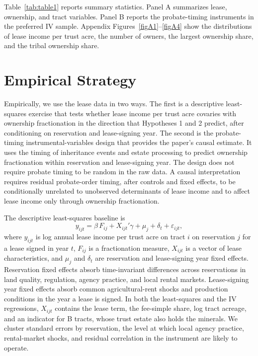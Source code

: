 \documentclass[12pt]{article}
\begin{document}
Table~\ref{tab:table1} reports summary statistics. Panel A summarizes lease, ownership, and tract variables. Panel B reports the probate-timing instruments in the preferred IV sample. Appendix Figures~\ref{figA1}--\ref{figA4} show the distributions of lease income per trust acre, the number of owners, the largest ownership share, and the tribal ownership share.

\section{Empirical Strategy} \label{Econometrics}

Empirically, we use the lease data in two ways. The first is a descriptive least-squares exercise that tests whether lease income per trust acre covaries with ownership fractionation in the direction that Hypotheses 1 and 2 predict, after conditioning on reservation and lease-signing year. The second is the probate-timing instrumental-variables design that provides the paper's causal estimate. It uses the timing of inheritance events and estate processing to predict ownership fractionation within reservation and lease-signing year. The design does not require probate timing to be random in the raw data. A causal interpretation requires residual probate-order timing, after controls and fixed effects, to be conditionally unrelated to unobserved determinants of lease income and to affect lease income only through ownership fractionation.

The descriptive least-squares baseline is
\begin{equation} \label{(20)}
   y_{ijt} = \beta\, F_{ij} + X_{ijt}'\gamma + \mu_j + \delta_t + \varepsilon_{ijt},
\end{equation}
\noindent where $y_{ijt}$ is log annual lease income per trust acre on tract $i$ on reservation $j$ for a lease signed in year $t$, $F_{ij}$ is a fractionation measure, $X_{ijt}$ is a vector of lease characteristics, and $\mu_j$ and $\delta_t$ are reservation and lease-signing year fixed effects. Reservation fixed effects absorb time-invariant differences across reservations in land quality, regulation, agency practice, and local rental markets. Lease-signing year fixed effects absorb common agricultural-rent shocks and production conditions in the year a lease is signed. In both the least-squares and the IV regressions, $X_{ijt}$ contains the lease term, the fee-simple share, log tract acreage, and an indicator for B tracts, whose trust estate also holds the minerals. We cluster standard errors by reservation, the level at which local agency practice, rental-market shocks, and residual correlation in the instrument are likely to operate.
\end{document}
